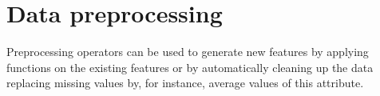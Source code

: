 \section{Data preprocessing}

Preprocessing operators can be used to generate new features by
applying functions on the existing features or by automatically
cleaning up the data replacing missing values by, for instance,
average values of this attribute.

